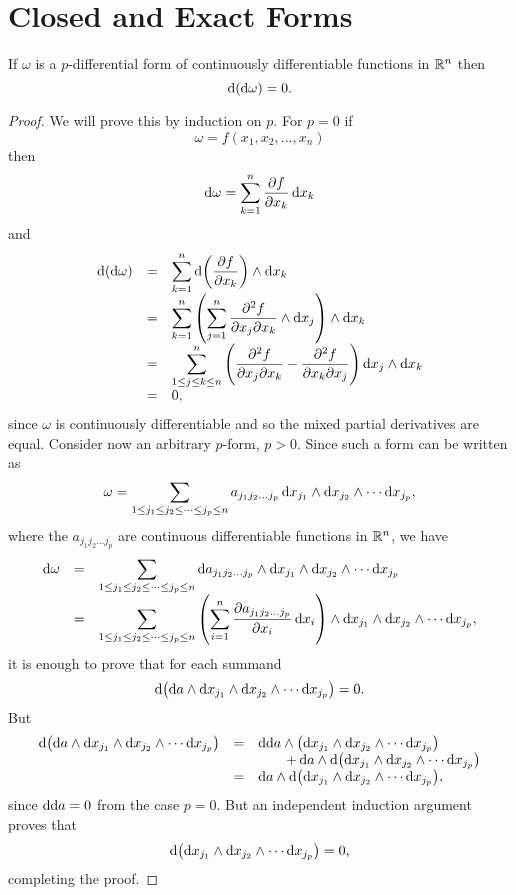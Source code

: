 \section{Closed and Exact Forms}
\begin{lemma} \label{thm:poincare_lemma}
If $\omega$ is a $p$-differential form of continuously
differentiable functions  in $\mathbb{R}^n$ then $$ \d{(\d{\omega})} =
0.
$$
\end{lemma}
\begin{proof}
We will prove this  by induction on $p$. For $p= 0$ if
$$\omega = f(x_1, x_2, \ldots , x_n)  $$
then
$$\d{\omega} = \dsum _{k = 1} ^n \frac{\partial f}{\partial x_k}\d{x_k}  $$
and
$$\begin{array} {lll}\d{(\d{\omega})} & =  & \dsum _{k = 1} ^n \d{\left(\frac{\partial f}{\partial x_k}\right)}\wedge\d{x_k} \\
& = &  \dsum _{k = 1} ^n \left(\dsum _{j = 1} ^n \frac{\partial ^2
f}{\partial x_j\partial x_k} \wedge \d{x_j}\right)\wedge\d{x_k}\\
& = &  \dsum _{1 \leq j \leq k \leq n} ^n  \left(\frac{\partial ^2
f}{\partial x_j\partial x_k} - \frac{\partial ^2
f}{\partial x_k\partial x_j} \right)\d{x_j}\wedge\d{x_k}\\
& = & 0,
\end{array}$$
since $\omega$ is continuously differentiable and so the mixed
partial derivatives are equal. Consider now an arbitrary $p$-form,
$p>0$. Since such a form can be written as
$$\omega =  \dsum _{ 1 \leq j_1 \leq j_2 \leq \cdots \leq j_p \leq n} a_{j_1j_2\ldots j_p}\d{x_{j_1}} \wedge \d{x_{j_2}} \wedge \cdots \d{x_{j_p}},
$$where the $a_{j_1j_2\ldots j_p}$ are continuous differentiable
functions in $\mathbb{R}^n$, we have
$$\begin{array}{lll}\d{\omega}  & = &   \dsum _{ 1 \leq j_1 \leq j_2 \leq \cdots \leq j_p \leq n} \d{a_{j_1j_2\ldots j_p}} \wedge \d{x_{j_1}} \wedge \d{x_{j_2}} \wedge \cdots
\d{x_{j_p}}\\
& = &  \dsum _{ 1 \leq j_1 \leq j_2 \leq \cdots \leq j_p \leq n}
\left(\dsum _{i=1} ^n \frac{\partial a_{j_1j_2\ldots j_p}}{\partial
x_i}\d{x_i}\right) \wedge \d{x_{j_1}} \wedge \d{x_{j_2}} \wedge
\cdots \d{x_{j_p}}, \end{array}
$$
it is enough to prove that for each summand
$$\d{\left(\d{a} \wedge\d{x_{j_1}} \wedge \d{x_{j_2}} \wedge \cdots \d{x_{j_p}}\right)} = 0.$$
But $$\begin{array}{lll}\d{\left(\d{a}\wedge\d{x_{j_1}} \wedge
\d{x_{j_2}} \wedge \cdots \d{x_{j_p}}\right)}  & = &
\d{\d{a}}\wedge \left(\d{x_{j_1}} \wedge \d{x_{j_2}} \wedge \cdots
\d{x_{j_p}}\right) \\ & & \qquad  + \d{a}\wedge
\d{\left(\d{x_{j_1}} \wedge \d{x_{j_2}} \wedge \cdots
\d{x_{j_p}}\right)}\\ & = & \d{a}\wedge \d{\left(\d{x_{j_1}}
\wedge \d{x_{j_2}} \wedge \cdots \d{x_{j_p}}\right)},
\end{array} $$ since $\d{\d{a}} = 0$ from the case $p=0$. But an
independent induction argument proves that
$$  \d{\left(\d{x_{j_1}}
\wedge \d{x_{j_2}} \wedge \cdots \d{x_{j_p}}\right)}=0,$$
completing the proof.
\end{proof}


